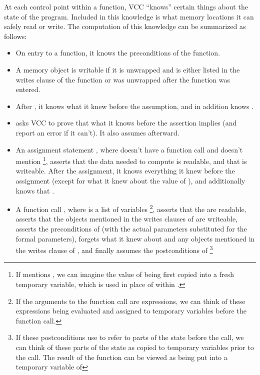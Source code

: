 {{At each control point within a function, VCC ``knows'' certain things
about the state of the program. Included in this knowledge is what
memory locations it can safely read or write. The computation of this
knowledge can be summarized as follows:
\begin{itemize}
\item
On entry to a function, it knows the preconditions of the function.
\item
A memory object is writable if it is unwrapped and is either listed in the 
writes clause of the function or was unwrapped after the function was entered.
\item
After , it knows what it knew before the assumption,
and in addition knows .
\item
{} asks VCC to prove that what it knows before the
assertion implies  (and report an error if it can't). 
It also assumes  afterward.
\item
{}
An assignment statement , where  doesn't have a 
function call and doesn't mention %
\footnote{
  If  mentions , we can imagine the value of  being
  first copied into a fresh temporary variable, which is used in place
  of  within .
}, asserts that the data needed to
compute  is readable, and that  is writeable. After the
assignment, it knows everything it knew before the assignment (except
for what it knew about the value of ), and additionally knows
that . 
\item 
A function call , where  is a list of variables%
\footnote{
  If the arguments to the function call are expressions, we can think
  of these expressions being evaluated and assigned to temporary
  variables before the function call.
}, asserts that the  are readable, asserts that the objects
mentioned in the writes clauses of  are writeable,
asserts the preconditions of  (with the actual parameters
substituted for the formal parameters), forgets what it knew about
 and any objects mentioned in the writes clause of , and
finally assumes the postconditions of %
\footnote{If these postconditions use \vcc{\\old} to refer to parts of
  the state before the call, we can think of these parts of the state
  as copied to temporary variables prior to the call. The result of
  the function can be viewed as being put into a temporary variable of
}
\end{itemize}}}
